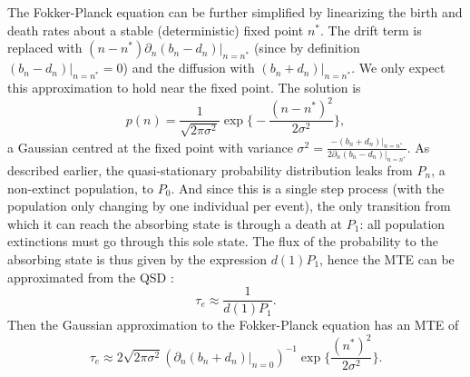 The Fokker-Planck equation can be further simplified by linearizing the birth and death rates about a stable (deterministic) fixed point $n^*$. 
The drift term is replaced with $(n-n^*)\partial_n(b_n - d_n)|_{n=n^*}$ (since by definition $(b_n - d_n)|_{n=n^*}=0$) and the diffusion with $(b_n + d_n)|_{n=n^*}$. 
We only expect this approximation to hold near the fixed point. 
The solution is 
\begin{equation}
p (n) = \frac{1}{\sqrt{2\pi\sigma^{2}}}\exp\Big\lbrace-\frac{(n-n^*)^2}{2\sigma^{2}}\Big\rbrace,
 \label{FP-gaussian}
\end{equation}
a Gaussian centred at the fixed point with variance $\sigma^2=\frac{-(b_n + d_n)|_{n=n^*}}{2\partial_n(b_n - d_n)|_{n=n^*}}$. 
As described earlier, the quasi-stationary probability distribution leaks from $P_n$, a non-extinct population, to $P_0$.
And since this is a single step process (with the population only changing by one individual per event), the only transition from which it can reach the absorbing state is through a death at $P_1$: all population extinctions must go through this sole state. 
The flux of the probability to the absorbing state is thus given by the expression $d(1)P_1$, hence the MTE can be approximated from the QSD \cite{Assaf2016}:
\begin{equation}
\tau_e \approx \frac{1}{d(1)P_1}.
 \label{1overd1P1}
\end{equation}
Then the Gaussian approximation to the Fokker-Planck equation has an MTE of
\begin{equation}
\tau_e \approx 2\sqrt{2\pi\sigma^{2}} \left( \partial_n(b_n + d_n)|_{n=0} \right)^{-1} \exp\Big\{\frac{(n^*)^2}{2\sigma^{2}}\Big\}. 
\end{equation}

